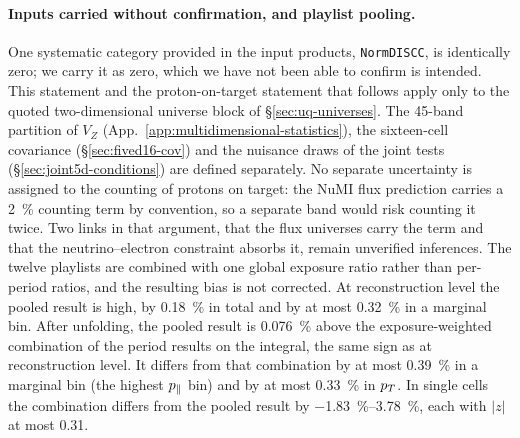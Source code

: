 \paragraph{Inputs carried without confirmation, and playlist pooling.} One systematic category provided in the input products, \texttt{NormDISCC}, is identically zero; we carry it as zero, which we have not been able to confirm is intended. This statement and the proton-on-target statement that follows apply only to the quoted two-dimensional universe block of \S\ref{sec:uq-universes}. The 45-band partition of $V_Z$ (App.~\ref{app:multidimensional-statistics}), the sixteen-cell covariance (\S\ref{sec:fived16-cov}) and the nuisance draws of the joint tests (\S\ref{sec:joint5d-conditions}) are defined separately. No separate uncertainty is assigned to the counting of protons on target: the NuMI flux prediction carries a \SI{2}{\percent} counting term by convention, so a separate band would risk counting it twice. Two links in that argument, that the flux universes carry the term and that the neutrino--electron constraint absorbs it, remain unverified inferences. The twelve playlists are combined with one global exposure ratio rather than per-period ratios, and the resulting bias is not corrected. At reconstruction level the pooled result is high, by \SI{0.18}{\percent} in total and by at most \SI{0.32}{\percent} in a marginal bin. After unfolding, the pooled result is \SI{0.076}{\percent} above the exposure-weighted combination of the period results on the integral, the same sign as at reconstruction level. It differs from that combination by at most \SI{0.39}{\percent} in a marginal bin (the highest $p_{\parallel}$ bin) and by at most \SI{0.33}{\percent} in $p_{T}$. In single cells the combination differs from the pooled result by \SIrange{-1.83}{3.78}{\percent}, each with $|z|$ at most 0.31.

